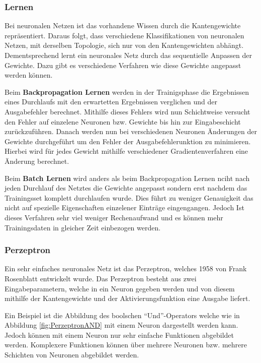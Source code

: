     \subsubsection{Lernen}
    Bei neuronalen Netzen ist das vorhandene Wissen durch die Kantengewichte repräsentiert.
    Daraus folgt, dass verschiedene Klassifikationen von neuronalen Netzen, mit derselben Topologie, sich nur von den Kantengewichten abhängt.
    Dementsprechend lernt ein neuronales Netz durch das sequentielle Anpassen der Gewichte.
    Dazu gibt es verschiedene Verfahren wie diese Gewichte angepasst werden können.
    \newline

    \noindent
    Beim \textbf{Backpropagation Lernen} werden in der Trainigsphase die Ergebnissen eines Durchlaufs mit den erwartetten Ergebnissen verglichen und der Ausgabefehler berechnet.
    Mithilfe dieses Fehlers wird nun Schichtweise versucht den Fehler auf einzelene Neuronen bzw. Gewichte bis hin zur Eingabeschicht zurückzuführen.
    Danach werden nun bei verschiedenen Neuronen Änderungen der Gewichte durchgeführt um den Fehler der Ausgabefehlerunktion zu minimieren.
    Hierbei wird für jedes Gewicht mithilfe verschiedener Gradientenverfahren eine Änderung berechnet.
    \newline

    \noindent
    Beim \textbf{Batch Lernen} wird anders als beim Backpropagation Lernen nciht nach jeden Durchlauf des Netztes die Gewichte angepasst sondern erst nachdem das Trainingsset komplett durchlaufen wurde.
    Dies führt zu weniger Genauigkeit das nicht auf spezielle Eigenschaften einzelener Einträge eingengangen.
    Jedoch Ist dieses Verfahren sehr viel weniger Rechenaufwand und es können mehr Trainingsdaten in gleicher Zeit einbezogen werden.
    
    \subsubsection{Perzeptron}
    Ein sehr einfaches neuronales Netz ist das Perzeptron, welches 1958 von Frank Rosenblatt entwickelt wurde.
    Das Perzeptron besteht aus zwei Eingabeparametern, welche in ein Neuron gegeben werden und von diesem mithilfe der Kantengewichte und der Aktivierungsfunktion eine Ausgabe liefert.

    Ein Beispiel ist die Abbildung des boolschen "`Und"'-Operators welche wie in Abbildung \ref{fig:PerzeptronAND} mit einem Neuron dargestellt werden kann.
    Jedoch können mit einem Neuron nur sehr einfache Funktionen abgebildet werden. 
    Komplexere Funktionen können über mehrere Neuronen bzw. mehrere Schichten von Neuronen abgebildet werden.

